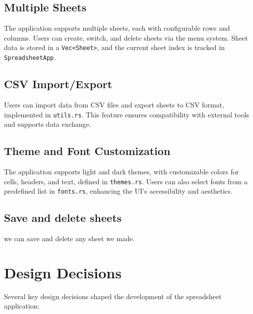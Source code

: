 \documentclass{article}
\begin{document}
\subsection{Multiple Sheets}
The application supports multiple sheets, each with configurable rows and columns. Users can create, switch, and delete sheets via the menu system. Sheet data is stored in a \texttt{Vec<Sheet>}, and the current sheet index is tracked in \texttt{SpreadsheetApp}.

\subsection{CSV Import/Export}
Users can import data from CSV files and export sheets to CSV format, implemented in \texttt{utils.rs}. This feature ensures compatibility with external tools and supports data exchange.

\subsection{Theme and Font Customization}
The application supports light and dark themes, with customizable colors for cells, headers, and text, defined in \texttt{themes.rs}. Users can also select fonts from a predefined list in \texttt{fonts.rs}, enhancing the UI's accessibility and aesthetics.

\subsection{Save and delete sheets} 
we can save and delete any sheet we made.

\section{Design Decisions}
Several key design decisions shaped the development of the spreadsheet application:
\end{document}

